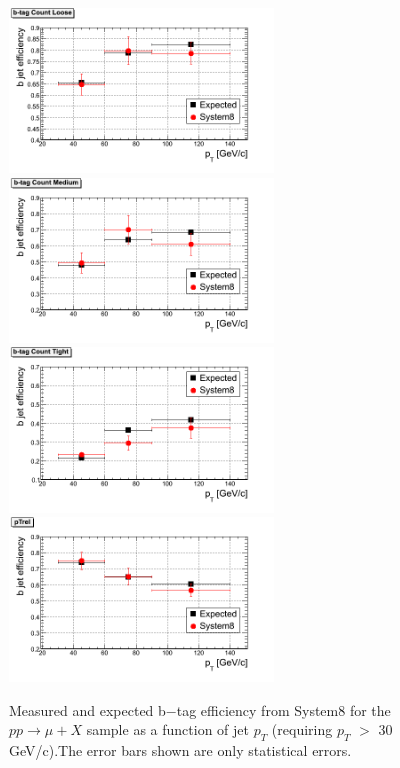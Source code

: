\begin{figure}[htbp]
  \begin{center}
    \includegraphics[width=70mm]{Figures/TCL_Tag.png}
    \includegraphics[width=70mm]{Figures/TCM_Tag.png}
    \includegraphics[width=70mm]{Figures/TCT_Tag.png}
    \includegraphics[width=70mm]{Figures/pTrel.png}
  \end{center}
  \caption{Measured and expected b$-$tag efficiency from System8 for the 
$pp\rightarrow \mu+ X$ sample as a function of jet $p_T $ 
(requiring $p_T $ $> $ 30 GeV/c).The error bars shown are only statistical 
errors.}
  \label{fig:S8_TC_results}
\end{figure}
\vspace{-5cm}

